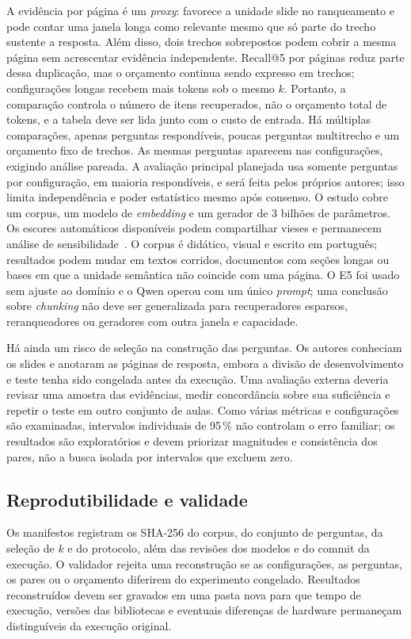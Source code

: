 \documentclass[conference]{IEEEtran}
\begin{document}
A evidência por página é um \textit{proxy}: favorece a unidade slide no ranqueamento e pode contar uma janela longa como relevante mesmo que só parte do trecho sustente a resposta.
Além disso, dois trechos sobrepostos podem cobrir a mesma página sem acrescentar evidência independente.
Recall@5 por páginas reduz parte dessa duplicação, mas o orçamento continua sendo expresso em trechos; configurações longas recebem mais tokens sob o mesmo $k$.
Portanto, a comparação controla o número de itens recuperados, não o orçamento total de tokens, e a tabela deve ser lida junto com o custo de entrada.
Há múltiplas comparações, apenas \NRespondiveisTeste{} perguntas respondíveis, poucas perguntas multitrecho e um orçamento fixo de \TopK{} trechos.
As mesmas perguntas aparecem nas \NConfiguracoes{} configurações, exigindo análise pareada.
A avaliação principal planejada usa somente \NPerguntasAmostra{} perguntas por configuração, em maioria respondíveis, e será feita pelos próprios autores; isso limita independência e poder estatístico mesmo após consenso.
O estudo cobre um corpus, um modelo de \textit{embedding} e um gerador de 3 bilhões de parâmetros.
Os escores automáticos disponíveis podem compartilhar vieses e permanecem análise de sensibilidade~\cite{panickssery2024llm}.
O corpus é didático, visual e escrito em português; resultados podem mudar em textos corridos, documentos com seções longas ou bases em que a unidade semântica não coincide com uma página.
O E5 foi usado sem ajuste ao domínio e o Qwen operou com um único \textit{prompt}; uma conclusão sobre \textit{chunking} não deve ser generalizada para recuperadores esparsos, reranqueadores ou geradores com outra janela e capacidade.

Há ainda um risco de seleção na construção das perguntas.
Os autores conheciam os slides e anotaram as páginas de resposta, embora a divisão de desenvolvimento e teste tenha sido congelada antes da execução.
Uma avaliação externa deveria revisar uma amostra das evidências, medir concordância sobre sua suficiência e repetir o teste em outro conjunto de aulas.
Como várias métricas e configurações são examinadas, intervalos individuais de 95\,\% não controlam o erro familiar; os resultados são exploratórios e devem priorizar magnitudes e consistência dos pares, não a busca isolada por intervalos que excluem zero.

\subsection{Reprodutibilidade e validade}
Os manifestos registram os SHA-256 do corpus, do conjunto de perguntas, da seleção de $k$ e do protocolo, além das revisões dos modelos e do commit da execução.
O validador rejeita uma reconstrução se as \NConfiguracoes{} configurações, as \NPerguntasTeste{} perguntas, os \NPares{} pares ou o orçamento diferirem do experimento congelado.
Resultados reconstruídos devem ser gravados em uma pasta nova para que tempo de execução, versões das bibliotecas e eventuais diferenças de hardware permaneçam distinguíveis da execução original.
\end{document}
